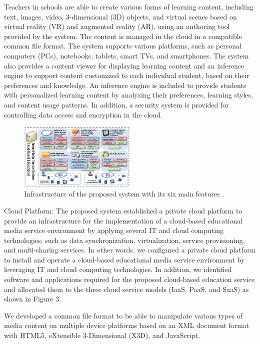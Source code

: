 \documentclass[journal]{vgtc}                %
\begin{document}
  Teachers in schools are able to create various forms of learning content, including text, images, video, 3-dimensional (3D) objects, and virtual scenes based on virtual reality (VR) and augmented reality (AR), using an authoring tool provided by the system. The content is managed in the cloud in a compatible common file format. The system supports various platforms, such as personal computers (PCs), notebooks, tablets, smart TVs, and smartphones. The system also provides a content viewer for displaying learning content and an inference engine to support content customized to each individual student, based on their preferences and knowledge. An inference engine is included to provide students with personalized learning content by analyzing their preferences, learning styles, and content usage patterns. In addition, a security system is provided for controlling data access and encryption in the cloud.

  \begin{figure}[htb]
    \centering
    \includegraphics[width=0.5\textwidth]{content-oriented-feature}
    \caption{Infrastructure of the proposed system with its six main features \cite{jeong2013content}.}
    \label{feature}
  \end{figure}

  Cloud Platform: The proposed system established a private cloud platform to provide an infrastructure for the implementation of a cloud-based educational media service environment by applying several IT and cloud computing technologies, such as data synchronization, virtualization, service provisioning, and multi-sharing services. In other words, we configured a private cloud platform to install and operate a cloud-based educational media service environment by leveraging IT and cloud computing technologies. In addition, we identified software and applications required for the proposed cloud-based education service and allocated them to the three cloud service models (IaaS, PaaS, and SaaS) as shown in Figure 3.

  We developed a common file format to be able to manipulate various types of media content on multiple device platforms based on an XML document format with HTML5, eXtensible 3-Dimensional (X3D), and JavaScript.
  
\end{document}
